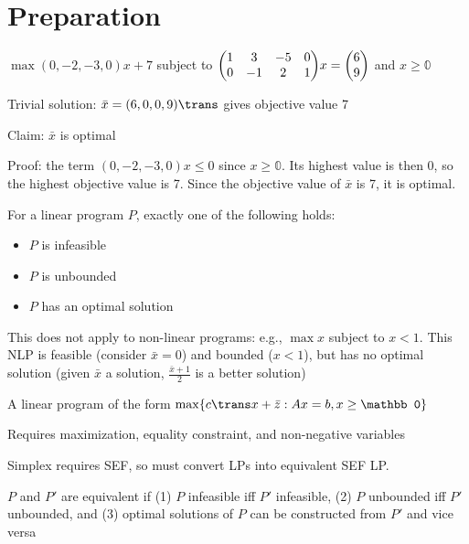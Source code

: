 \section{Preparation}

\begin{example}
  $\max{} (0,-2,-3,0)x+7$ subject to $\mqty(1&3&-5&0\\0&-1&2&1)x=\mqty(6\\9)$ and $x \geq \mathbb 0$
\end{example}

\begin{sol}
  Trivial solution: $\bar x = (6,0,0,9)\trans$ gives objective value 7

  Claim: $\bar x$ is optimal

  Proof: the term $(0,-2,-3,0)x \leq 0$ since $x \geq \mathbb 0$.
  Its highest value is then 0, so the highest objective value is 7.
  Since the objective value of $\bar x$ is 7, it is optimal.
\end{sol}

\begin{theorem}
  For a linear program $P$, exactly one of the following holds:
  \begin{itemize}[nosep]
    \item $P$ is infeasible
    \item $P$ is unbounded
    \item $P$ has an optimal solution
  \end{itemize}
\end{theorem}

This does not apply to non-linear programs: e.g., $\max x$ subject
to $x < 1$. This NLP is feasible (consider $\bar x = 0$) and
bounded ($x < 1$), but has no optimal solution (given $\bar x$ a
solution, $\frac{\bar x+1}{2}$ is a better solution)

\begin{defn}
  A linear program of the form
  $\max \{c\trans x + \bar z : Ax = b, x \geq \mathbb 0\}$

  Requires maximization, equality constraint, and non-negative
  variables
\end{defn}

Simplex requires SEF, so must convert LPs into equivalent SEF LP.

\begin{defn}[equivalence]
  $P$ and $P'$ are equivalent if
  (1) $P$ infeasible iff $P'$ infeasible,
  (2) $P$ unbounded iff $P'$ unbounded, and
  (3) optimal solutions of $P$ can be constructed from $P'$ and vice versa
\end{defn}

